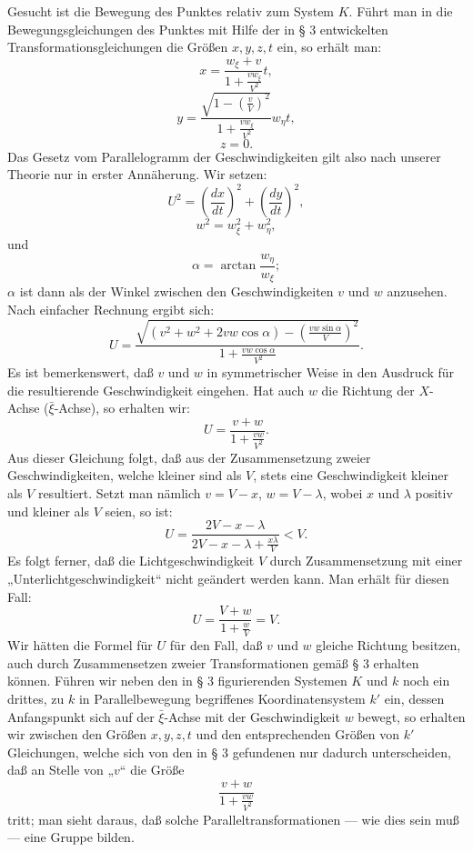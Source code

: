 \documentclass[17pt]{webarticle}       %
\begin{document}
Gesucht ist die Bewegung des Punktes relativ zum System \( K \). Führt man in die Bewegungsgleichungen des Punktes mit Hilfe der in § 3 entwickelten Transformationsgleichungen die Größen \( x, y, z, t \) ein, so erhält man:
\[
x = \frac{w_\xi + v}{1 + \frac{v w_\xi}{V^2}} t,
\]
\[
y = \frac{\sqrt{1 - \left( \frac{v}{V} \right)^2}}{1 + \frac{v w_\xi}{V^2}} w_\eta t,
\]
\[
z = 0.
\]
Das Gesetz vom Parallelogramm der Geschwindigkeiten gilt also nach unserer Theorie nur in erster Annäherung. Wir setzen:
\[
U^2 = \left( \frac{dx}{dt} \right)^2 + \left( \frac{dy}{dt} \right)^2,
\]
\[
w^2 = w_\xi^2 + w_\eta^2,
\]
und
\[
\alpha = \arctan \frac{w_\eta}{w_\xi};
\]
\(\alpha\) ist dann als der Winkel zwischen den Geschwindigkeiten \( v \) und \( w \) anzusehen. Nach einfacher Rechnung ergibt sich:
\[
U = \frac{\sqrt{(v^2 + w^2 + 2vw \cos \alpha) - \left( \frac{vw \sin \alpha}{V} \right)^2}}{1 + \frac{vw \cos \alpha}{V^2}}.
\]
Es ist bemerkenswert, daß \( v \) und \( w \) in symmetrischer Weise in den Ausdruck für die resultierende Geschwindigkeit eingehen. Hat auch \( w \) die Richtung der \( X \)-Achse (\(\bar{\xi}\)-Achse), so erhalten wir:
\[
U = \frac{v + w}{1 + \frac{vw}{V^2}}.
\]
Aus dieser Gleichung folgt, daß aus der Zusammensetzung zweier Geschwindigkeiten, welche kleiner sind als \( V \), stets eine Geschwindigkeit kleiner als \( V \) resultiert. Setzt man nämlich \( v = V - x \), \( w = V - \lambda \), wobei \( x \) und \( \lambda \) positiv und kleiner als \( V \) seien, so ist:
\[
U = \frac{2V - x - \lambda}{2V - x - \lambda + \frac{x\lambda}{V}} < V.
\]
Es folgt ferner, daß die Lichtgeschwindigkeit \( V \) durch Zusammensetzung mit einer „Unterlichtgeschwindigkeit“ nicht geändert werden kann. Man erhält für diesen Fall:
\[
U = \frac{V + w}{1 + \frac{w}{V}} = V.
\]
Wir hätten die Formel für \( U \) für den Fall, daß \( v \) und \( w \) gleiche Richtung besitzen, auch durch Zusammensetzen zweier Transformationen gemäß § 3 erhalten können. Führen wir neben den in § 3 figurierenden Systemen \( K \) und \( k \) noch ein drittes, zu \( k \) in Parallelbewegung begriffenes Koordinatensystem \( k' \) ein, dessen Anfangspunkt sich auf der \(\bar{\xi}\)-Achse mit der Geschwindigkeit \( w \) bewegt, so erhalten wir zwischen den Größen \( x, y, z, t \) und den entsprechenden Größen von \( k' \) Gleichungen, welche sich von den in § 3 gefundenen nur dadurch unterscheiden, daß an Stelle von „\( v \)“ die Größe
\[
\frac{v + w}{1 + \frac{vw}{V^2}}
\]
tritt; man sieht daraus, daß solche Paralleltransformationen — wie dies sein muß — eine Gruppe bilden.
\end{document}
